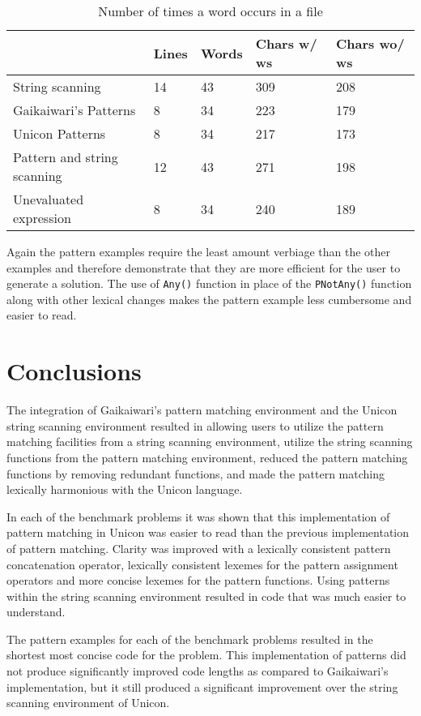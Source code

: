 \documentclass{article}
\begin{document}
\begin{table}[ht]
	\caption{Number of times a word occurs in a file}
	\centering
	\begin{tabular}{|l|l|l|l|l|}
		\hline\hline
		 & Lines & Words & Chars w/ ws & Chars wo/ ws\\
		\hline
		String scanning & 14 & 43 & 309 & 208 \\
		Gaikaiwari's Patterns & 8 & 34 & 223 & 179 \\
		Unicon Patterns & 8 & 34 & 217 & 173 \\
		Pattern and string scanning & 12 & 43 & 271 & 198 \\
		Unevaluated expression & 8 & 34 & 240 & 189 \\
		\hline
	\end{tabular}
\end{table}
Again the pattern examples require the least amount verbiage than the other examples and therefore demonstrate that they are more efficient for the user to generate a solution.  The use of \texttt{Any()} function in place of the \texttt{PNotAny()} function along with other lexical changes makes the pattern example less cumbersome and easier to read.

\section{Conclusions}
The integration of Gaikaiwari's pattern matching environment and the Unicon string scanning environment resulted in allowing users to utilize the pattern matching facilities from a string scanning environment, utilize the string scanning functions from the pattern matching environment, reduced the pattern matching functions by removing redundant functions, and made the pattern matching lexically harmonious with the Unicon language.

In each of the benchmark problems it was shown that this implementation of pattern matching in Unicon was easier to read than the previous implementation of pattern matching.  Clarity was improved with a lexically consistent pattern concatenation operator, lexically consistent lexemes for the pattern assignment operators and more concise lexemes for the pattern functions.  Using patterns within the string scanning environment resulted in code that was much easier to understand.

The pattern examples for each of the benchmark problems resulted in the shortest most concise code for the problem.  This implementation of patterns did not produce significantly improved code lengths as compared to Gaikaiwari's implementation, but it still produced a significant improvement over the string scanning environment of Unicon.
\end{document}
